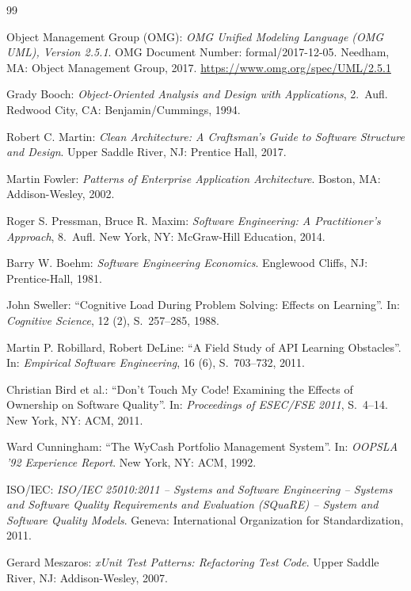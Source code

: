 ﻿\documentclass[a4paper,12pt]{article}
\begin{document}
\begin{thebibliography}{99}
	
	Object Management Group (OMG):
	\textit{OMG Unified Modeling Language (OMG UML), Version 2.5.1}.
	OMG Document Number: formal/2017-12-05.
	Needham, MA: Object Management Group, 2017.
	\url{https://www.omg.org/spec/UML/2.5.1}
	
	Grady Booch:
	\textit{Object-Oriented Analysis and Design with Applications}, 2.~Aufl.
	Redwood City, CA: Benjamin/Cummings, 1994.
	
	Robert C. Martin:
	\textit{Clean Architecture: A Craftsman's Guide to Software Structure and Design}.
	Upper Saddle River, NJ: Prentice Hall, 2017.
	
	Martin Fowler:
	\textit{Patterns of Enterprise Application Architecture}.
	Boston, MA: Addison-Wesley, 2002.
	
	Roger S. Pressman, Bruce R. Maxim:
	\textit{Software Engineering: A Practitioner's Approach}, 8.~Aufl.
	New York, NY: McGraw-Hill Education, 2014.
	
	Barry W. Boehm:
	\textit{Software Engineering Economics}.
	Englewood Cliffs, NJ: Prentice-Hall, 1981.
	
	John Sweller:
	\enquote{Cognitive Load During Problem Solving: Effects on Learning}.
	In: \textit{Cognitive Science}, 12 (2), S.~257--285, 1988.
	
	Martin P. Robillard, Robert DeLine:
	\enquote{A Field Study of API Learning Obstacles}.
	In: \textit{Empirical Software Engineering}, 16 (6), S.~703--732, 2011.
	
	Christian Bird et al.:
	\enquote{Don't Touch My Code! Examining the Effects of Ownership on Software Quality}.
	In: \textit{Proceedings of ESEC/FSE 2011}, S.~4--14. New York, NY: ACM, 2011.
	
	Ward Cunningham:
	\enquote{The WyCash Portfolio Management System}.
	In: \textit{OOPSLA '92 Experience Report}. New York, NY: ACM, 1992.
	
	ISO/IEC:
	\textit{ISO/IEC 25010:2011 -- Systems and Software Engineering -- Systems and
		Software Quality Requirements and Evaluation (SQuaRE) -- System and Software
		Quality Models}.
	Geneva: International Organization for Standardization, 2011.
	
	Gerard Meszaros:
	\textit{xUnit Test Patterns: Refactoring Test Code}.
	Upper Saddle River, NJ: Addison-Wesley, 2007.
	

\end{thebibliography}
\end{document}
